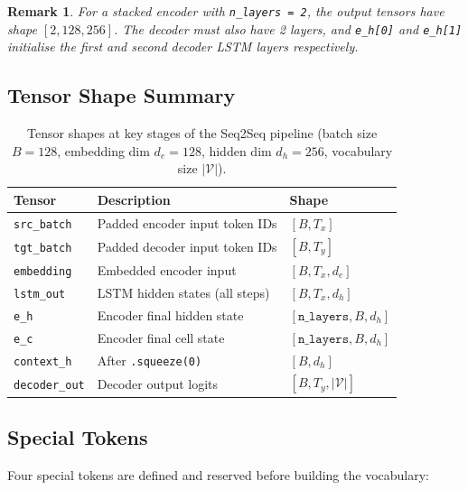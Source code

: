 \documentclass[12pt,a4paper]{article}
\newtheorem{remark}{Remark}[section]
\begin{document}
\begin{remark}
  \label{rem:nlayers}
  For a stacked encoder with \texttt{n\_layers = 2}, the output tensors have
  shape $[2, 128, 256]$.  The decoder must also have 2 layers, and
  \texttt{e\_h[0]} and \texttt{e\_h[1]} initialise the first and second
  decoder LSTM layers respectively.
\end{remark}

\subsection{Tensor Shape Summary}
\label{subsec:shapes}

\begin{table}[ht]
\centering
\caption{Tensor shapes at key stages of the Seq2Seq pipeline
         (batch size $B=128$, embedding dim $d_e=128$, hidden dim
         $d_h=256$, vocabulary size $|\mathcal{V}|$).}
\label{tab:tensor_shapes}
\begin{tabularx}{\textwidth}{lXl}
\toprule
\textbf{Tensor} & \textbf{Description} & \textbf{Shape} \\
\midrule
\texttt{src\_batch}    & Padded encoder input token IDs & $[B, T_x]$ \\
\texttt{tgt\_batch}    & Padded decoder input token IDs & $[B, T_y]$ \\
\texttt{embedding}     & Embedded encoder input         & $[B, T_x, d_e]$ \\
\texttt{lstm\_out}     & LSTM hidden states (all steps) & $[B, T_x, d_h]$ \\
\texttt{e\_h}          & Encoder final hidden state     & $[\texttt{n\_layers}, B, d_h]$ \\
\texttt{e\_c}          & Encoder final cell state       & $[\texttt{n\_layers}, B, d_h]$ \\
\texttt{context\_h}    & After \texttt{.squeeze(0)}     & $[B, d_h]$ \\
\texttt{decoder\_out}  & Decoder output logits          & $[B, T_y, |\mathcal{V}|]$ \\
\bottomrule
\end{tabularx}
\end{table}

\subsection{Special Tokens}
\label{subsec:special_tokens}

Four special tokens are defined and reserved before building the vocabulary:
\end{document}
